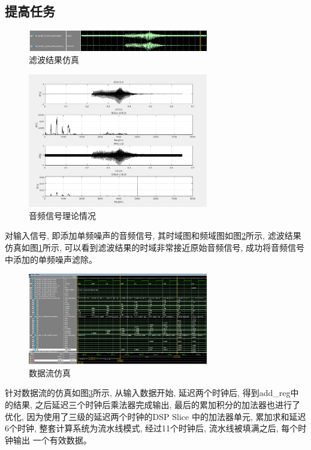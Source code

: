 \documentclass{article}
\begin{document}
\subsection*{提高任务}
\begin{figure}[H]
    \centering
    \includegraphics[width=0.7\textwidth]{image/2024-06-26-20-09-26.png}
    \caption{滤波结果仿真}
    \label{image_improve_sim_1_1}
\end{figure}
\begin{figure}[H]
    \centering
    \includegraphics[width=0.7\textwidth]{image/2024-06-26-20-11-58.png}
    \caption{音频信号理论情况}
    \label{image_improve_sim_1_2}
\end{figure}
对输入信号, 即添加单频噪声的音频信号, 其时域图和频域图如图\ref{image_improve_sim_1_2}所示, 
滤波结果仿真如图\ref{image_improve_sim_1_1}所示, 可以看到滤波结果的时域非常接近原始音频信号, 
成功将音频信号中添加的单频噪声滤除。
\begin{figure}[htbp]
    \centering
    \includegraphics[width=0.7\textwidth]{image/2024-06-26-20-38-56.png}
    \caption{数据流仿真}
    \label{image_improve_sim_2}
\end{figure}
针对数据流的仿真如图\ref{image_improve_sim_2}所示, 从输入数据开始, 延迟两个时钟后, 得到add\_reg中的结果, 
之后延迟三个时钟后乘法器完成输出, 最后的累加积分的加法器也进行了优化, 因为使用了三级的延迟两个时钟的DSP Slice
中的加法器单元, 累加求和延迟6个时钟, 整套计算系统为流水线模式, 经过11个时钟后, 流水线被填满之后, 每个时钟输出
一个有效数据。
\end{document}
